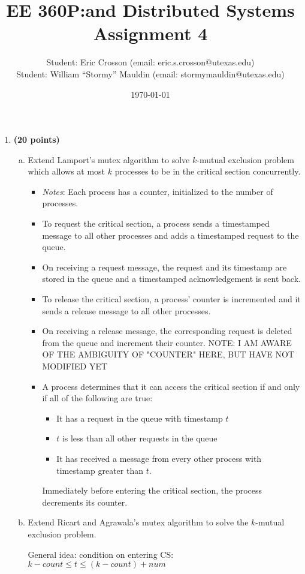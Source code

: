 \documentclass[11pt]{article}
\newcounter{problem}
\begin{document}
\title{EE 360P:\@Concurrent and Distributed Systems \\ Assignment 4}
\author{Student: Eric Crosson (email: eric.s.crosson@utexas.edu)\\
  Student: William ``Stormy'' Mauldin (email: stormymauldin@utexas.edu)}
\date{\today}
\maketitle

\begin{enumerate}
\item \textbf{(20 points)} 
\begin{enumerate}[(a)]
\item Extend Lamport's mutex algorithm to solve $k$-mutual exclusion problem which allows at most $k$ processes to be in the critical section concurrently.

\begin{itemize}
\item \emph{Notes}: Each process has a counter, initialized to the number of processes.
\item To request the critical section, a process sends a timestamped message to all other processes and adds a timestamped request to the queue.
\item On receiving a request message, the request and its timestamp are stored in the queue and a timestamped acknowledgement is sent back.
\item To release the critical section, a process' counter is incremented and it sends a release message to all other processes.
\item On receiving a release message, the corresponding request is deleted from the queue and increment their counter. NOTE: I AM AWARE OF THE AMBIGUITY OF "COUNTER" HERE, BUT HAVE NOT MODIFIED YET
\item A process determines that it can access the critical section if and only if all of the following are true: 
\begin{itemize}
\item It has a request in the queue with timestamp $t$
\item $t$ is less than all other requests in the queue
\item It has received a message from every other process with timestamp greater than $t$.
\end{itemize}
Immediately before entering the critical section, the process decrements its counter.
\end{itemize}


\item Extend Ricart and Agrawala's mutex algorithm to solve the $k$-mutual exclusion problem.   

General idea: condition on entering CS: $k - count \leq t \leq (k - count) + num$

\end{enumerate}
\end{enumerate}
\end{document}
